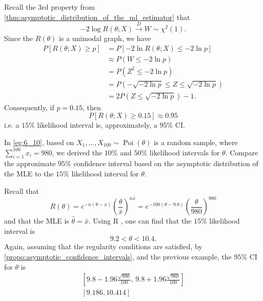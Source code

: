 \documentclass[notoc,notitlepage]{tufte-book}
\DeclareMathOperator{\Poi}{Poi }
\newcommand{\convd}{\overset{D}{\to}}
\begin{document}
\begin{note}
  Recall the 3rd property from \cref{thm:asymptotic_distribution_of_the_ml_estimator} that
  \begin{equation*}
    -2 \log R(\theta; X) \convd W \sim \chi^2(1).
  \end{equation*}
  Since the $R(\theta)$ is a unimodal graph, we have
  \begin{align*}
    P[ R(\theta; X) \geq p ] &= P[ - 2 \ln R(\theta; X) \leq -2 \ln p ] \\
                             &\approx P(W \leq - 2 \ln p) \\
                             &= P(Z^2 \leq -2 \ln p) \\
                             &= P\left( - \sqrt{-2 \ln p} \leq Z \leq \sqrt{-2 \ln p} \right) \\
                             &= 2P\left(Z \leq \sqrt{-2 \ln p}\right) - 1.
  \end{align*}
  Consequently, if $p = 0.15$, then
  \begin{equation*}
    P[R(\theta; X) \geq 0.15] \approx 0.95
  \end{equation*}
  i.e. a $15\%$ likelihood interval is, approximately, a $95\%$ CI.
\end{note}

\begin{eg}[Example 6.24]
  In \cref{eg:6_10}, based on $X_1, ..., X_{100} \sim \Poi(\theta)$ is a random sample, where $\sum_{i=1}^{100} x_i = 980$, we derived the $10\%$ and $50\%$ likelihood intervals for $\theta$. Compare the approximate $95\%$ confidence interval based on the asymptotic distribution of the MLE to the $15\%$ likelihood interval for $\theta$.
\end{eg}

\begin{solution}
  Recall that
  \begin{equation*}
    R(\theta) = e^{-n ( \theta - \bar{x} )} \left( \frac{\theta}{\bar{x}} \right)^{n \bar{x}} = e^{-100 ( \theta - 9.8 )} \left( \frac{\theta}{980} \right)^{980}
  \end{equation*}
  and that the MLE is $\hat{\theta} = \bar{x}$. Using R , one can find that the $15\%$ likelihood interval is
  \begin{equation*}
    9.2 < \theta < 10.4.
  \end{equation*}
  Again, assuming that the regularity conditions are satisfied, by \cref{propo:asymptotic_confidence_intervals}, and the previous example, the $95\%$ CI for $\theta$ is
  \begin{gather*}
    \left[ 9.8 - 1.96 \frac{\sqrt{980}}{100} , \, 9.8 + 1.96 \frac{\sqrt{980}}{100} \right] \\
    [ 9.186, 10.414 ]
  \end{gather*}
\end{solution}
\end{document}
